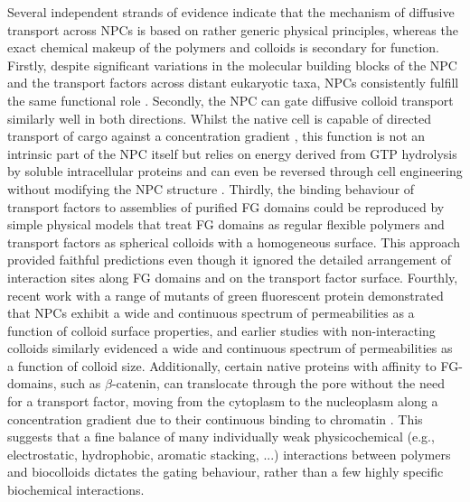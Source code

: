 \documentclass[12pt, a4paper]{article}
\begin{document}
Several independent strands of evidence indicate that the mechanism of diffusive transport across NPCs is based on rather generic physical principles, whereas the exact chemical makeup of the polymers and colloids is secondary for function.
Firstly, despite significant variations in the molecular building blocks of the NPC and the transport factors across distant eukaryotic taxa, NPCs consistently fulfill the same functional role \cite{DeGrasse2009, Maimon2012, Ori2013, Hayama2017, Yaron2018, Holzer2018}.
Secondly, the NPC can gate diffusive colloid transport similarly well in both directions.
Whilst the native cell is capable of directed transport of cargo against a concentration gradient \cite{Rout2003, Tijana2017}, this function is not an intrinsic part of the NPC itself but relies on energy derived from GTP hydrolysis by soluble intracellular proteins \cite{Lowe2015, Yang2004} and can even be reversed through cell engineering without modifying the NPC structure \cite{Nachury1999, Sakiyama2016}.
Thirdly, the binding behaviour of transport factors to assemblies of purified FG domains could be reproduced by simple physical models that treat FG domains as regular flexible polymers and transport factors as spherical colloids with a homogeneous surface. This approach provided faithful predictions even though it ignored the detailed arrangement of interaction sites along FG domains and on the transport factor surface. 
Fourthly, recent work with a range of mutants of green fluorescent protein demonstrated that NPCs exhibit a wide and continuous spectrum of permeabilities as a function of colloid surface properties, and earlier studies with non-interacting colloids similarly evidenced a wide and continuous spectrum of permeabilities as a function of colloid size.
Additionally, certain native proteins with affinity to FG-domains, such as $\beta$-catenin, can translocate through the pore without the need for a transport factor, moving from the cytoplasm to the nucleoplasm along a concentration gradient due to their continuous binding to chromatin \cite{Rout2003}. This suggests that a fine balance of many individually weak physicochemical (e.g., electrostatic, hydrophobic, aromatic stacking, ...) interactions between polymers and biocolloids dictates the gating behaviour, rather than a few highly specific biochemical interactions.

\end{document}
